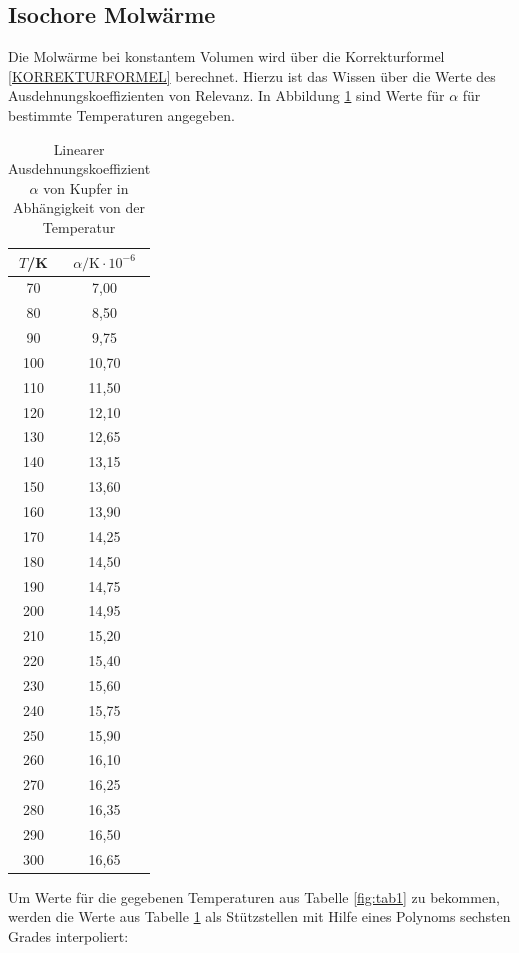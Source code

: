 \subsection{Isochore Molwärme}
Die Molwärme bei konstantem Volumen wird über die Korrekturformel \ref{KORREKTURFORMEL} berechnet. Hierzu ist das Wissen über die Werte des Ausdehnungskoeffizienten von Relevanz. In Abbildung \ref{fig:tab3} sind Werte für \(\alpha\) für bestimmte Temperaturen angegeben.

\begin{table}[H]
	\begin{center}
		\begin{tabular}{c c}
			\toprule
			\(T\)/K & \(\alpha/\text{K}\cdot10^{-6}\)\\
			\midrule
			70	&7,00\\
			80	&8,50\\
			90	&9,75\\
			100	&10,70\\
			110	&11,50\\
			120	&12,10\\
			130	&12,65\\
			140	&13,15\\
			150	&13,60\\
			160	&13,90\\
			170	&14,25\\
			180	&14,50\\
			190	&14,75\\
			200	&14,95\\
			210	&15,20\\
			220	&15,40\\
			230	&15,60\\
			240	&15,75\\
			250	&15,90\\
			260	&16,10\\
			270	&16,25\\
			280	&16,35\\
			290	&16,50\\
			300	&16,65\\
			\bottomrule
		\end{tabular}
		\caption{Linearer Ausdehnungskoeffizient \(\alpha\) von Kupfer in Abhängigkeit von der Temperatur}
		\label{fig:tab3}
	\end{center}
\end{table}

\noindent Um Werte für die gegebenen Temperaturen aus Tabelle \ref{fig:tab1} zu bekommen, werden die Werte aus Tabelle \ref{fig:tab3} als Stützstellen mit Hilfe eines Polynoms sechsten Grades interpoliert:

